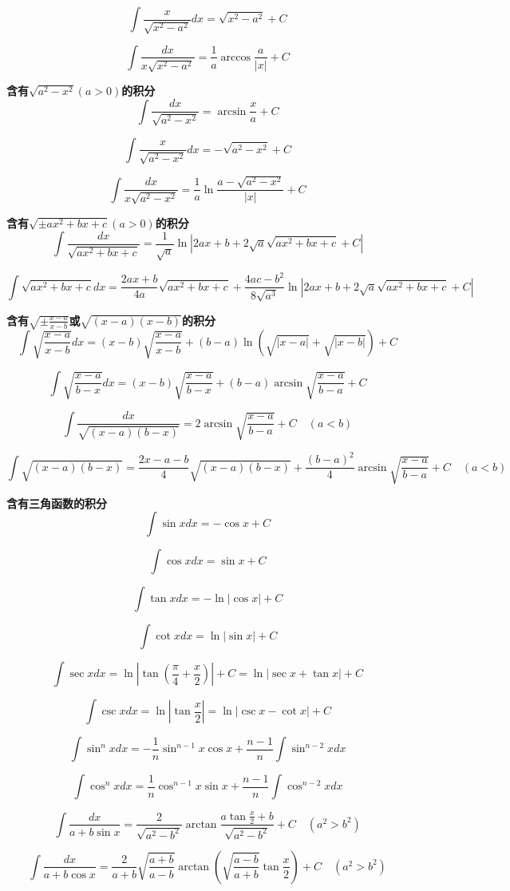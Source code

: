 \documentclass{book}
\begin{document}
$$ \int \frac{x}{\sqrt{x^2-a^2}}dx=\sqrt{x^2-a^2}+C $$

$$ \int \frac{dx}{x\sqrt{x^2-a^2}}=\frac{1}{a}\arccos \frac{a}{|x|}+C $$

\textbf{含有$\sqrt{a^2-x^2}(a>0)$的积分}
$$ \int \frac{dx}{\sqrt{a^2-x^2}}=\arcsin \frac{x}{a}+C $$

$$ \int \frac{x}{\sqrt{a^2-x^2}}dx=-\sqrt{a^2 - x^2}+C $$

$$ \int \frac{dx}{x\sqrt{a^2-x^2}}=\frac{1}{a}\ln \frac{a-\sqrt{a^2 - x^2}}{|x|}+C $$

\textbf{含有$\sqrt{\pm ax^2+bx+c}(a>0)$的积分}
$$ \int \frac{dx}{\sqrt{ax^2+bx+c}}=\frac{1}{\sqrt{a}} \ln|2ax+b+2\sqrt{a}\sqrt{ax^2+bx+c}+C| $$

$$ \int \sqrt{ax^2+bx+c}dx=\frac{2ax+b}{4a}\sqrt{ax^2+bx+c}+ \frac{4ac-b^2}{8\sqrt{a^3}} \ln|2ax+b+2\sqrt{a}\sqrt{ax^2+bx+c}+C| $$

\textbf{含有$\sqrt{\pm \frac{x-a}{x-b}}$或$\sqrt{(x-a)(x-b)}$的积分}
$$ \int \sqrt{\frac{x-a}{x-b}}dx=(x-b)\sqrt{\frac{x-a}{x-b}}+ (b-a)\ln (\sqrt{|x-a|}+\sqrt{|x-b|})+C $$

$$ \int \sqrt{\frac{x-a}{b-x}}dx=(x-b)\sqrt{\frac{x-a}{b-x}}+ (b-a)\arcsin \sqrt{\frac{x-a}{b-a}}+C $$

$$ \int \frac{dx}{\sqrt{(x-a)(b-x)}}=2\arcsin \sqrt{\frac{x-a}{b-a}}+C \quad(a<b) $$

$$ \int \sqrt{(x-a)(b-x)}=\frac{2x-a-b}{4}\sqrt{(x-a)(b-x)} + \frac{(b-a)^2}{4}\arcsin \sqrt{\frac{x-a}{b-a}}+C \quad(a<b) $$

\textbf{含有三角函数的积分}
$$ \int \sin xdx=-\cos x +C $$

$$ \int \cos xdx =\sin x +C $$

$$ \int \tan xdx=-\ln|\cos x|+C $$

$$ \int \cot xdx=\ln|\sin x|+C $$

$$ \int \sec xdx=\ln|\tan(\frac{\pi}{4}+\frac{x}{2})|+C=\ln|\sec x+ \tan x|+C $$

$$ \int \csc xdx=\ln|\tan \frac{x}{2}|=\ln|\csc x-\cot x|+C $$


$$ \int \sin^n x dx=-\frac{1}{n}\sin^{n-1}x \cos x + \frac{n-1}{n}\int \sin^{n-2}x dx $$

$$ \int \cos^n x dx=\frac{1}{n}\cos^{n-1}x \sin x + \frac{n-1}{n}\int \cos^{n-2}x dx $$

$$ \int \frac{dx}{a+b\sin x}=\frac{2}{\sqrt{a^2-b^2}}\arctan \frac{a \tan \frac{x}{2}+b}{\sqrt{a^2-b^2}}+C \quad(a^2>b^2) $$

$$ \int \frac{dx}{a+b\cos x}=\frac{2}{a+b} \sqrt{\frac{a+b}{a-b}}\arctan(\sqrt{\frac{a-b}{a+b}}\tan \frac{x}{2})+C \quad (a^2>b^2) $$
\end{document}
